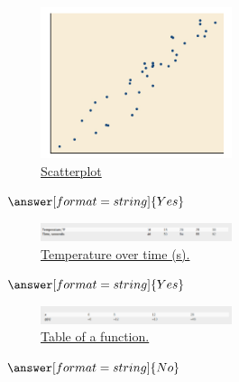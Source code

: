 \documentclass{ximera}
\begin{document}
\begin{question}
\begin{figure}
\includegraphics[width=0.5\textwidth]{positiveR.png}
\caption{\href{https://cnx.org/contents/mwjClAV_@8.12:6dX4RGdg@12/Fitting-Linear-Models-to-Data}{Scatterplot}}
\end{figure}
$\answer[format=string]{Yes}$
\end{question}

\begin{question}
\begin{figure}
\includegraphics[width=0.5\textwidth]{temperature.png}
\caption{\href{https://cnx.org/contents/mwjClAV_@8.12:6dX4RGdg@12/Fitting-Linear-Models-to-Data}{Temperature over time (s).}}
\end{figure}
$\answer[format=string]{Yes}$
\end{question}

\begin{question}
\begin{figure}
\includegraphics[width=0.5\textwidth]{tableFunction.png}
\caption{\href{https://cnx.org/contents/mwjClAV_@8.12:6dX4RGdg@12/Fitting-Linear-Models-to-Data}{Table of a function.}}
\end{figure}
$\answer[format=string]{No}$
\end{question}
\end{document}
